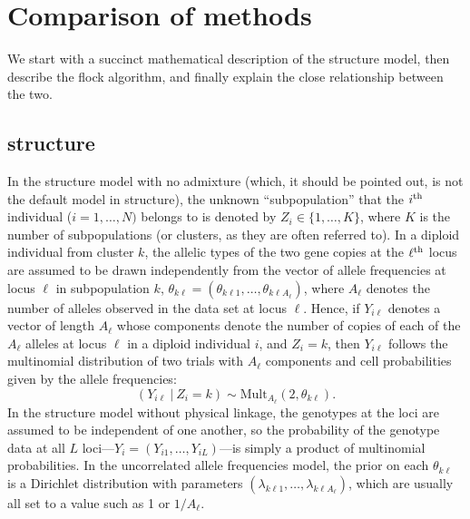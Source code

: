 \section*{Comparison of methods}
We start with a succinct mathematical description of the {\sc structure}
model, then describe the {\sc flock} algorithm, and finally explain
the close relationship between the two.


\subsection*{{\sc structure}}
In the {\sc structure} model with no admixture (which, it should be pointed out, 
is not the default model in {\sc structure}), the unknown ``subpopulation'' that the 
$i^\mathrm{th}$ individual ($i=1,\ldots,N)$ belongs to is denoted by $Z_i \in \{1,\ldots,K\}$, 
where $K$ is the 
number of subpopulations (or clusters, as they are often referred to).  
In a diploid individual from cluster $k$, the 
allelic types of the two gene copies at the $\ell^\mathrm{th}$ locus are assumed
to be drawn independently from the vector of allele frequencies at
locus $\ell$ in subpopulation $k$,  $\theta_{k\ell}=(\theta_{k\ell 1},\ldots,\theta_{k\ell A_\ell})$, where 
$A_\ell$ 
denotes the number of alleles observed in the data set at locus $\ell$.
Hence, if $Y_{i\ell}$ denotes a vector of length $A_\ell$ whose components denote the 
number
of copies of each of the $A_\ell$ alleles at locus $\ell$ in a diploid individual $i$, and 
$Z_i=k$, then $Y_{i\ell}$ follows the multinomial distribution of two trials with
$A_\ell$  components and cell probabilities given by the allele frequencies: 
\begin{equation}
(Y_{i\ell}~|~Z_i=k) \sim \mathrm{Mult}_{A_\ell}(2, \theta_{k\ell}).
\end{equation}
In the {\sc structure} model without physical linkage, the genotypes at the loci are assumed to
be independent of one another, so the probability of the genotype data at
all $L$ loci---$Y_i=(Y_{i1},\ldots,Y_{iL})$---is simply a product of multinomial 
probabilities.
In the uncorrelated allele frequencies model, the prior on each $\theta_{k\ell}$ is a
Dirichlet distribution with parameters $(\lambda_{k\ell1},\ldots,\lambda_{k\ell A_
\ell})$,
which are usually all set to a value such as 1 or $1/A_\ell$.  

